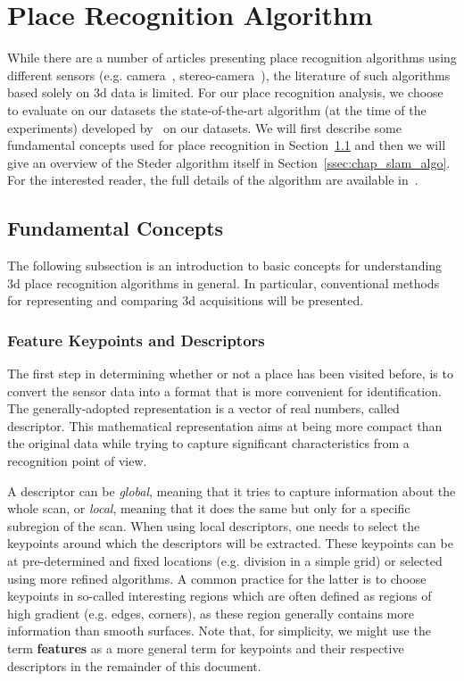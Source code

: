 \section{Place Recognition Algorithm}
\label{sec:chap_slam_algo}

While there are a number of articles presenting place recognition algorithms using different sensors (e.g. camera~\citep{Cummins2011}, stereo-camera~\citep{Cadena2012}), the literature of such algorithms based solely on \gls*{3d} data is limited. For our place recognition analysis, we choose to evaluate on our datasets the state-of-the-art algorithm (at the time of the experiments) developed by~\citet{Steder2011b} on our datasets. We will first describe some fundamental concepts used for place recognition in Section~\ref{ssec:chap_slam_basics} and then we will give an overview of the Steder algorithm itself in Section~\ref{ssec:chap_slam_algo}. For the interested reader, the full details of the algorithm are available in~\citep{Steder2011b}.


\subsection{Fundamental Concepts}
\label{ssec:chap_slam_basics}

The following subsection is an introduction to basic concepts for understanding \gls*{3d} place recognition algorithms in general. In particular, conventional methods for representing and comparing \gls*{3d} acquisitions will be presented.

\subsubsection{Feature Keypoints and Descriptors}
\label{ssub:feature_keypoints_and_descriptors}

The first step in determining whether or not a place has been visited before, is to convert the sensor data into a format that is more convenient for identification. The generally-adopted representation is a vector of real numbers, called descriptor. This mathematical representation aims at being more compact than the original data while trying to capture significant characteristics from a recognition point of view.

A descriptor can be \emph{global}, meaning that it tries to capture information about the whole scan, or \emph{local}, meaning that it does the same but only for a specific subregion of the scan. When using local descriptors, one needs to select the keypoints around which the descriptors will be extracted. These keypoints can be at pre-determined and fixed locations (e.g. division in a simple grid) or selected using more refined algorithms. A common practice for the latter is to choose keypoints in so-called interesting regions which are often defined as regions of high gradient (e.g. edges, corners), as these region generally contains more information than smooth surfaces. Note that, for simplicity, we might use the term \textbf{features} as a more general term for keypoints and their respective descriptors in the remainder of this document.

